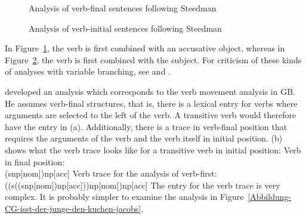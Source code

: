 \begin{figure}
\centerline{%
}
\caption{\label{Abbildung-CG-der-Mann-der-Frau-das-Buch-gibt}Analysis of verb-final sentences following Steedman}
\end{figure}%
\begin{figure}
\centerline{%
}
\caption{\label{Abbildung-CG-gibt-der-Mann-der-Frau-das-Buch}Analysis of verb-initial sentences following Steedman}
\end{figure}%
In Figure~\ref{Abbildung-CG-der-Mann-der-Frau-das-Buch-gibt}, the verb is first combined with an
accusative object, whereas in Figure~\ref{Abbildung-CG-gibt-der-Mann-der-Frau-das-Buch}, the verb is first combined with the subject. For criticism of these kinds of analyses
with variable branching, see  and .


\citet[Section~2.6]{Jacobs91a} developed an analysis which corresponds to the verb movement analysis in GB\indexgb. He assumes verb-final structures, that is, there is a lexical entry for verbs
where arguments are selected to the left of the verb. A transitive verb would therefore have the
entry in (a). Additionally, there is a trace in verb-final position that requires the
arguments of the verb and the verb itself in initial position. (b) shows what the verb trace
looks like for a transitive verb in initial position: 
\eal
\ex Verb in final position:\\
    (s\bs np[nom])\bs np[acc]
\ex Verb trace for the analysis of verb-first:\\
    ((s\bs ((s\bs np[nom])\bs np[acc]))\bs np[nom])\bs np[acc]
\zl
The entry for the verb trace is very complex. It is probably simpler to examine the analysis in Figure~\vref{Abbildung-CG-isst-der-junge-den-kuchen-jacobs}.

